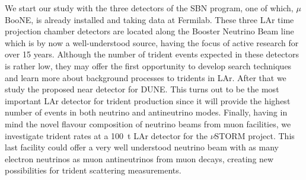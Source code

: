 We start our study with the three detectors of the SBN program, one of which, $\mu$BooNE, is already installed and taking data at Fermilab. These three LAr time projection chamber detectors are located along the Booster Neutrino Beam line which is by now a well-understood source, having the focus of active research for over 15 years. 
%
Although the number of trident events expected in these detectors is rather low, they may offer the first opportunity to develop search techniques and learn more about background processes to tridents in LAr.
%
After that we study the proposed near detector for DUNE. This turns out to be the most important LAr detector for trident production since it will provide the highest number of events in both neutrino and antineutrino modes. 
%
Finally, having in mind the novel flavour composition of neutrino beams from muon facilities, we investigate trident rates at a 100~t LAr detector for the $\nu$STORM project. This last facility could offer a very well understood neutrino beam with as many electron neutrinos as muon antineutrinos from muon decays, creating new possibilities for trident scattering measurements.
\renewcommand{\arraystretch}{1.2}
